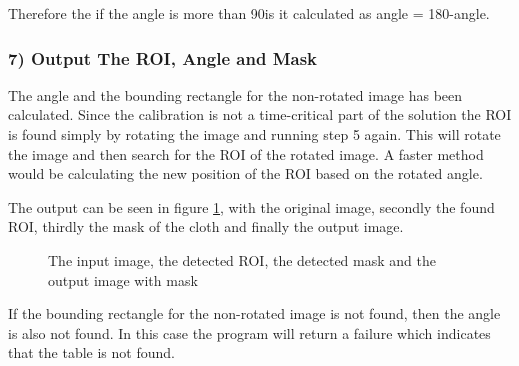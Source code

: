 Therefore the if the angle is more than 90\degree is it calculated as angle = 180\degree-angle.

\subsubsection{7) Output The ROI, Angle and Mask}
The angle and the bounding rectangle for the non-rotated image has been calculated. Since the calibration is not a time-critical part of the solution the ROI is found simply by rotating the image and running step 5 again.  This will rotate the image and then search for the ROI of the rotated image. A faster method would be calculating the new position of the ROI based on the rotated angle.

The output can be seen in figure \ref{fig:tablelocateoutput}, with the original image, secondly the found ROI, thirdly the mask of the cloth and finally the output image.

\begin{figure}[htpb]
\centering
{}

\caption{The input image, the detected ROI, the detected mask and the output image with mask}
\label{fig:tablelocateoutput}
\end{figure}

If the bounding rectangle for the non-rotated image is not found, then the angle is also not found. In this case the program will return a failure which indicates that the table is not found.